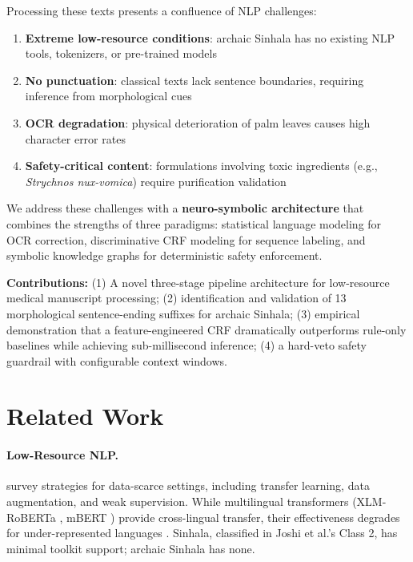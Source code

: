 \documentclass[11pt,a4paper]{article}
\begin{document}
Processing these texts presents a confluence of NLP challenges:

\begin{enumerate}[label=(\roman*), nosep]
    \item \textbf{Extreme low-resource conditions}: archaic Sinhala has no existing NLP tools, tokenizers, or pre-trained models
    \item \textbf{No punctuation}: classical texts lack sentence boundaries, requiring inference from morphological cues
    \item \textbf{OCR degradation}: physical deterioration of palm leaves causes high character error rates
    \item \textbf{Safety-critical content}: formulations involving toxic ingredients (e.g., \textit{Strychnos nux-vomica}) require purification validation
\end{enumerate}

We address these challenges with a \textbf{neuro-symbolic architecture} that combines the strengths of three paradigms: statistical language modeling for OCR correction, discriminative CRF modeling for sequence labeling, and symbolic knowledge graphs for deterministic safety enforcement.

\textbf{Contributions:} (1) A novel three-stage pipeline architecture for low-resource medical manuscript processing; (2) identification and validation of 13 morphological sentence-ending suffixes for archaic Sinhala; (3) empirical demonstration that a feature-engineered CRF dramatically outperforms rule-only baselines while achieving sub-millisecond inference; (4) a hard-veto safety guardrail with configurable context windows.

\section{Related Work}

\paragraph{Low-Resource NLP.} \citet{hedderich2021survey} survey strategies for data-scarce settings, including transfer learning, data augmentation, and weak supervision. While multilingual transformers (XLM-RoBERTa \citep{conneau2020unsupervised}, mBERT \citep{devlin2019bert}) provide cross-lingual transfer, their effectiveness degrades for under-represented languages \citep{joshi2020state}. Sinhala, classified in Joshi et al.'s Class 2, has minimal toolkit support; archaic Sinhala has none.
\end{document}
